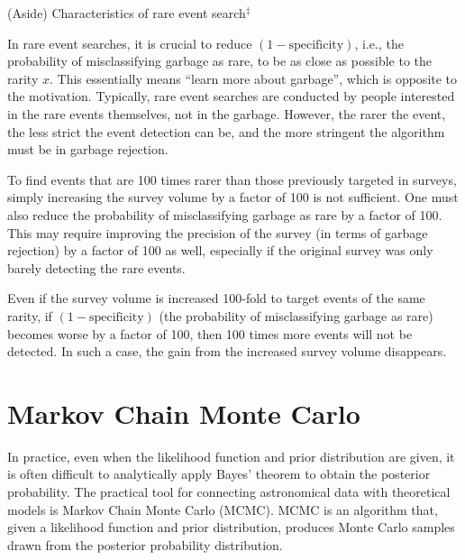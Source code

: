 \begin{itembox}{(Aside) Characteristics of rare event search$^\ddagger$}
\footnotesize

In rare event searches, it is crucial to reduce $(1 - \text{specificity})$, i.e., the probability of misclassifying garbage as rare, to be as close as possible to the rarity $x$. This essentially means ``learn more about garbage'', which is opposite to the motivation. Typically, rare event searches are conducted by people interested in the rare events themselves, not in the garbage. However, the rarer the event, the less strict the event detection can be, and the more stringent the algorithm must be in garbage rejection.

To find events that are 100 times rarer than those previously targeted in surveys, simply increasing the survey volume by a factor of 100 is not sufficient. One must also reduce the probability of misclassifying garbage as rare by a factor of 100. This may require improving the precision of the survey (in terms of garbage rejection) by a factor of 100 as well, especially if the original survey was only barely detecting the rare events.

Even if the survey volume is increased 100-fold to target events of the same rarity, if $(1 - \text{specificity})$ (the probability of misclassifying garbage as rare) becomes worse by a factor of 100, then 100 times more events will not be detected. In such a case, the gain from the increased survey volume disappears. %
\end{itembox}

\section{Markov Chain Monte Carlo}

In practice, even when the likelihood function and prior distribution are given, it is often difficult to analytically apply Bayes' theorem to obtain the posterior probability. The practical tool for connecting astronomical data with theoretical models is Markov Chain Monte Carlo (MCMC). MCMC is an algorithm that, given a likelihood function and prior distribution, produces Monte Carlo samples drawn from the posterior probability distribution.

